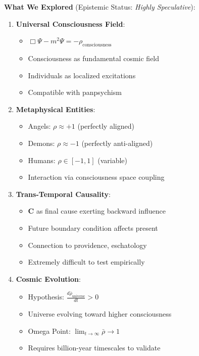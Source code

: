 \documentclass[11pt,a4paper]{article}
\theoremstyle{definition}
\theoremstyle{remark}
\begin{document}
\begin{enumerate}
\begin{mdframed}[backgroundcolor=green!10,linewidth=2pt,linecolor=green!70!black]
\textbf{What We Explored} (Epistemic Status: \textit{Highly Speculative}):

\begin{enumerate}[nosep]
    \item \textbf{Universal Consciousness Field}:
        \begin{itemize}[nosep]
            \item \(\Box \Psi - m^2 \Psi = -\rho_{\text{consciousness}}\)
            \item Consciousness as fundamental cosmic field
            \item Individuals as localized excitations
            \item Compatible with panpsychism
        \end{itemize}
    
    \item \textbf{Metaphysical Entities}:
        \begin{itemize}[nosep]
            \item Angels: \(\rho \approx +1\) (perfectly aligned)
            \item Demons: \(\rho \approx -1\) (perfectly anti-aligned)
            \item Humans: \(\rho \in [-1, 1]\) (variable)
            \item Interaction via consciousness space coupling
        \end{itemize}
    
    \item \textbf{Trans-Temporal Causality}:
        \begin{itemize}[nosep]
            \item \(\mathbf{C}\) as final cause exerting backward influence
            \item Future boundary condition affects present
            \item Connection to providence, eschatology
            \item Extremely difficult to test empirically
        \end{itemize}
    
    \item \textbf{Cosmic Evolution}:
        \begin{itemize}[nosep]
            \item Hypothesis: \(\frac{d\bar{\rho}_{\text{universe}}}{dt} > 0\)
            \item Universe evolving toward higher consciousness
            \item Omega Point: \(\lim_{t \to \infty} \bar{\rho} \to 1\)
            \item Requires billion-year timescales to validate
        \end{itemize}
    

\end{enumerate}
\end{mdframed}
\end{enumerate}
\end{document}

